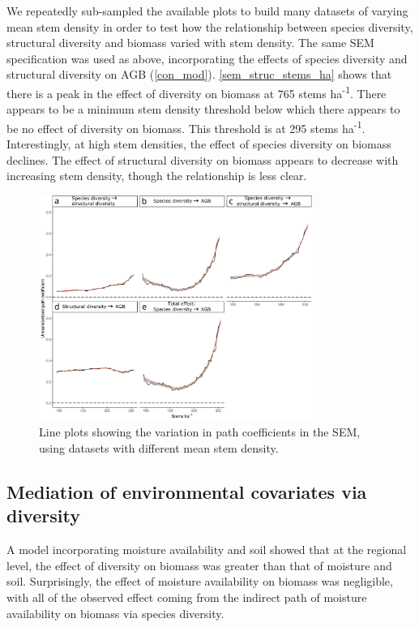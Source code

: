 \documentclass[11pt,a4paper]{article}
\begin{document}
We repeatedly sub-sampled the available plots to build many datasets of varying mean stem density in order to test how the relationship between species diversity, structural diversity and biomass varied with stem density. The same SEM specification was used as above, incorporating the effects of species diversity and structural diversity on AGB (\autoref{con_mod}).  \autoref{sem_struc_stems_ha} shows that there is a peak in the effect of diversity on biomass at \textapprox{}765 stems ha\textsuperscript{-1}. There appears to be a minimum stem density threshold below which there appears to be no effect of diversity on biomass. This threshold is at \textapprox{}295 stems ha\textsuperscript{-1}. Interestingly, at high stem densities, the effect of species diversity on biomass declines. The effect of structural diversity on biomass appears to decrease with increasing stem density, though the relationship is less clear. 

\begin{figure}[H]
\centering
	\includegraphics[width=0.8\textwidth]{sem_struc_stems_ha}
	\caption{Line plots showing the variation in path coefficients in the SEM, using datasets with different mean stem density.}
	\label{sem_struc_stems_ha}
\end{figure}

\subsection{Mediation of environmental covariates via diversity}

A model incorporating moisture availability and soil showed that at the regional level, the effect of diversity on biomass was greater than that of moisture and soil. Surprisingly, the effect of moisture availability on biomass was negligible, with all of the observed effect coming from the indirect path of moisture availability on biomass via species diversity. 
\end{document}
